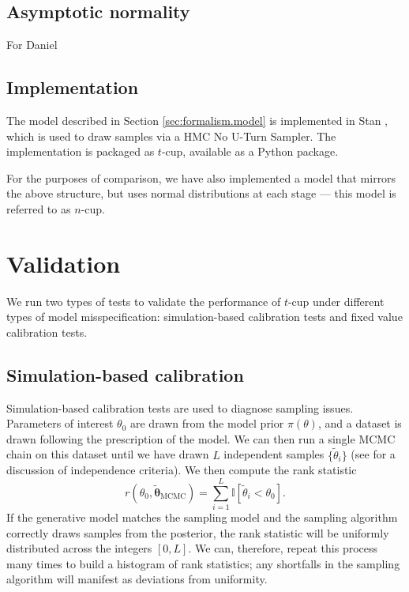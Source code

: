 \documentclass[fleqn,usenatbib]{mnras}
\begin{document}
\subsection{Asymptotic normality}
\label{sec:formalism.asymptotic}

{\color{green} For Daniel}

\subsection{Implementation}
\label{sec:formalism.implementation}

The model described in Section \ref{sec:formalism.model} is implemented in Stan
\citep{Stan}, which is used to draw samples via a HMC No U-Turn Sampler. The
implementation is packaged as $t$-cup, available as a Python
package\footnotemark.

For the purposes of comparison, we have also implemented a model that mirrors
the above structure, but uses normal distributions at each stage --- this model
is referred to as $n$-cup.


\section{Validation}
\label{sec:methods}

We run two types of tests to validate the performance of $t$-cup under different
types of model misspecification: simulation-based calibration tests
\citep{Cook:2006, Talts:2018} and fixed value calibration tests.

\subsection{Simulation-based calibration}
\label{sec:methods.sbc}

Simulation-based calibration tests \citep{Cook:2006, Talts:2018} are used to
diagnose sampling issues. Parameters of interest $\theta_0$ are drawn from the
model prior $\pi(\theta)$, and a dataset is drawn following the prescription of
the model. We can then run a single MCMC chain on this dataset until we have
drawn $L$ independent samples $\{\tilde{\theta}_{i}\}$ (see \citet{Talts:2018}
for a discussion of independence criteria). We then compute the rank statistic
\begin{equation}
    r(\theta_0, \tilde{\boldsymbol{\theta}}_{\text{MCMC}})
        = \sum_{i = 1}^{L} \mathbb I [\tilde{\theta}_i < \theta_0].
\end{equation}
If the generative model matches the sampling model and the sampling algorithm
correctly draws samples from the posterior, the rank statistic will be uniformly
distributed across the integers $[0, L]$. We can, therefore, repeat this process
many times to build a histogram of rank statistics; any shortfalls in the
sampling algorithm will manifest as deviations from uniformity.
\end{document}
